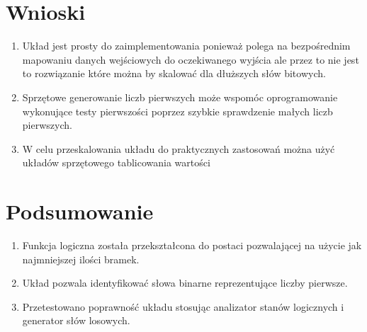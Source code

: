 \documentclass[12pt,a4paper,openright]{mwrep}
\begin{document}
\section{Wnioski}
\begin{enumerate}
    \item Układ jest prosty do zaimplementowania ponieważ polega na bezpośrednim mapowaniu danych wejściowych do oczekiwanego
    wyjścia ale przez to nie jest to rozwiązanie które można by skalować dla dłuższych słów bitowych.
    \item Sprzętowe generowanie liczb pierwszych może wspomóc oprogramowanie wykonujące testy pierwszości
    poprzez szybkie sprawdzenie małych liczb pierwszych.
    \item W celu przeskalowania układu do praktycznych zastosowań można użyć układów sprzętowego tablicowania wartości 
\end{enumerate}
\section{Podsumowanie}
\begin{enumerate}
    \item Funkcja logiczna została przekształcona do postaci pozwalającej na użycie jak najmniejszej ilości bramek.
    \item Układ pozwala identyfikować słowa binarne reprezentujące liczby pierwsze.
    \item Przetestowano poprawność układu stosując analizator stanów logicznych i generator słów losowych.
\end{enumerate}
\end{document}
